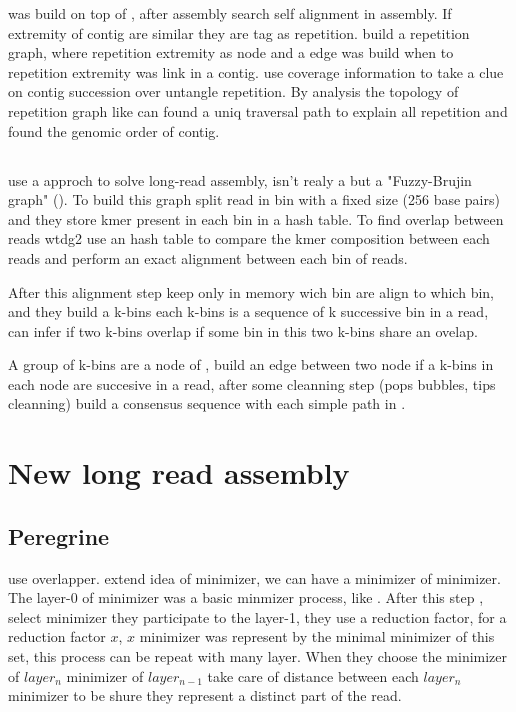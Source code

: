 \documentclass[main]{subfiles}
\begin{document}
\flye was build on top of \abruijn, after \abruijn assembly \flye search self alignment in assembly. If extremity of contig are similar they are tag as repetition. \flye build a repetition graph, where repetition extremity as node and a edge was build when to repetition extremity was link in a contig. \flye use coverage information to take a clue on contig succession over untangle repetition. By analysis the topology of repetition graph \flye like \hinge can found a uniq traversal path to explain all repetition and found the genomic order of contig.


\subsection{\wtdbg}

\wtdbg use a \DBG approch to solve long-read assembly, isn't realy a \DBG but a "Fuzzy-Brujin graph" (). To build this graph \wtdbg split read in bin with a fixed size (256 base pairs) and they store kmer present in each bin in a hash table.
To find overlap between reads wtdg2 use an hash table to compare the kmer composition between each reads and perform an exact alignment between each bin of reads. 

After this alignment step \wtdbg keep only in memory wich bin are align to which bin, and they build a k-bins each k-bins is a sequence of k successive bin in a read, \wtdbg can infer if two k-bins overlap if some bin in this two k-bins share an ovelap.

A group of k-bins are a node of , \wtdbg build an edge between two node if a k-bins in each node are succesive in a read, after some cleanning step (pops bubbles, tips cleanning) \wtdbg build a consensus sequence with each simple path in .

\section{New long read assembly}

\subsection{Peregrine}

\newcommand{\shimmer}{}

\peregrine \cite{Peregrine} use \shimmer overlapper. \shimmer extend idea of minimizer, we can have a minimizer of minimizer.
The layer-0 of minimizer was a basic minmizer process, like \minimap. After this step \shimmer, select minimizer they participate to the layer-1, they use a reduction factor, for a reduction factor $x$, $x$ minimizer was represent by the minimal minimizer of this set, this process can be repeat with many layer. When they choose the minimizer of $layer_n$ minimizer of $layer_{n-1}$ \shimmer take care of distance between each $layer_n$ minimizer to be shure they represent a distinct part of the read.
\end{document}
